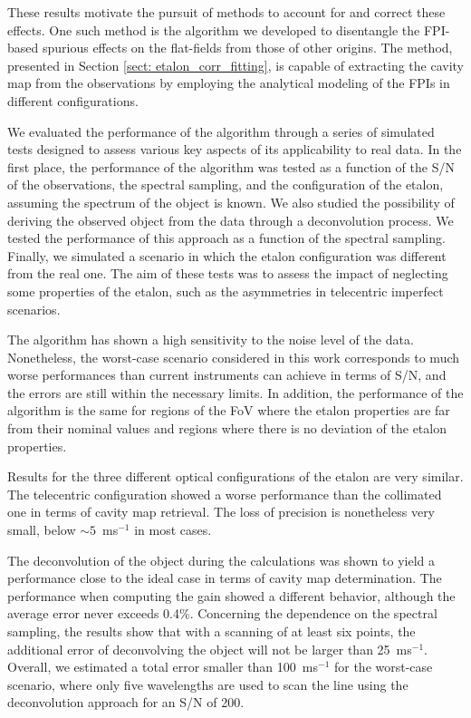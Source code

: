 These results motivate the pursuit of methods to account for and correct these effects. One such method is the algorithm we developed to disentangle the FPI-based spurious effects on the flat-fields from those of other origins. The method, presented in Section \ref{sect: etalon_corr_fitting}, is capable of extracting the cavity map from the observations by employing the analytical modeling of the FPIs in different configurations.

We evaluated the performance of the algorithm through a series of simulated tests designed to assess various key aspects of its applicability to real data. In the first place, the performance of the algorithm was tested as a function of the S/N of the observations, the spectral sampling, and the configuration of the etalon, assuming the spectrum of the object is known. We also studied the possibility of deriving the observed object from the data through a deconvolution process. We tested the performance of this approach as a function of the spectral sampling. Finally, we simulated a scenario in which the etalon configuration was different from the real one. The aim of these tests was to assess the impact of neglecting some properties of the etalon, such as the asymmetries in telecentric imperfect scenarios.

The algorithm has shown a high sensitivity to the noise level of the data. Nonetheless, the worst-case scenario considered in this work corresponds to much worse performances than current instruments can achieve in terms of S/N, and the errors are still within the necessary limits. In addition, the performance of the algorithm is the same for regions of the FoV where the etalon properties are far from their nominal values and regions where there is no deviation of the etalon properties. 

Results for the three different optical configurations of the etalon are very similar. The telecentric configuration showed a worse performance than the collimated one in terms of cavity map retrieval. The loss of precision is nonetheless very small, below $\sim 5$~ms$^{-1}$ in most cases. 

The deconvolution of the object during the calculations was shown to yield a performance close to the ideal case in terms of cavity map determination. The performance when computing the gain showed a different behavior, although the average error never exceeds 0.4\%. Concerning the dependence on the spectral sampling, the results show that with a scanning of at least six points, the additional error of deconvolving the object will not be larger than 25~ms$^{-1}$. Overall, we estimated a total error smaller than 100~ms$^{-1}$ for the worst-case scenario, where only five wavelengths are used to scan the line using the deconvolution approach for an S/N of 200.

